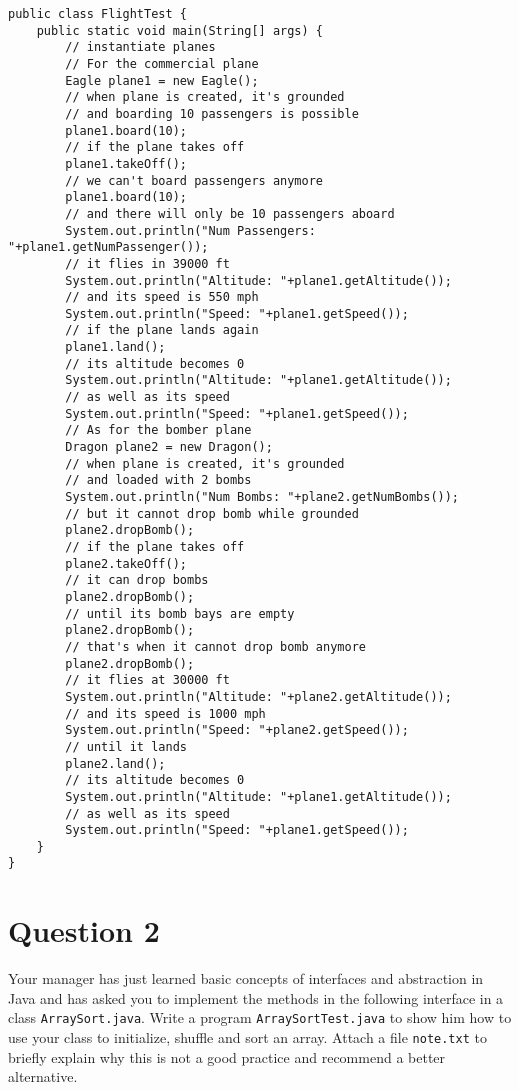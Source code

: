 \begin{enumerate}
\lstset{language=java,tabsize=2}
\begin{lstlisting}
public class FlightTest {
	public static void main(String[] args) {
		// instantiate planes
		// For the commercial plane
		Eagle plane1 = new Eagle();
		// when plane is created, it's grounded
		// and boarding 10 passengers is possible
		plane1.board(10);
		// if the plane takes off
		plane1.takeOff();
		// we can't board passengers anymore
		plane1.board(10);
		// and there will only be 10 passengers aboard
		System.out.println("Num Passengers: "+plane1.getNumPassenger());
		// it flies in 39000 ft
		System.out.println("Altitude: "+plane1.getAltitude());
		// and its speed is 550 mph
		System.out.println("Speed: "+plane1.getSpeed());
		// if the plane lands again
		plane1.land();
		// its altitude becomes 0
		System.out.println("Altitude: "+plane1.getAltitude());
		// as well as its speed
		System.out.println("Speed: "+plane1.getSpeed());
		// As for the bomber plane
		Dragon plane2 = new Dragon();
		// when plane is created, it's grounded
		// and loaded with 2 bombs
		System.out.println("Num Bombs: "+plane2.getNumBombs());
		// but it cannot drop bomb while grounded
		plane2.dropBomb();
		// if the plane takes off
		plane2.takeOff();
		// it can drop bombs
		plane2.dropBomb();
		// until its bomb bays are empty
		plane2.dropBomb();
		// that's when it cannot drop bomb anymore
		plane2.dropBomb();
		// it flies at 30000 ft
		System.out.println("Altitude: "+plane2.getAltitude());
		// and its speed is 1000 mph
		System.out.println("Speed: "+plane2.getSpeed());
		// until it lands
		plane2.land();
		// its altitude becomes 0
		System.out.println("Altitude: "+plane1.getAltitude());
		// as well as its speed
		System.out.println("Speed: "+plane1.getSpeed());
	}
}
\end{lstlisting}

\end{enumerate}

\section*{Question 2}

Your manager has just learned basic concepts of interfaces and abstraction in Java and has asked you to implement the methods in the following interface in a class \texttt{ArraySort.java}. Write a program \texttt{ArraySortTest.java} to show him how to use your class to initialize, shuffle and sort an array. Attach a file \texttt{note.txt} to briefly explain why this is not a good practice and recommend a better alternative.

